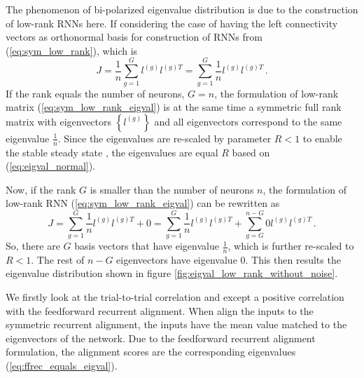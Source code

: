 \documentclass[11pt]{article}
\begin{document}
	The phenomenon of bi-polarized eigenvalue distribution is due to the construction of low-rank RNNs here. If considering the case of having the left connectivity vectors as orthonormal basis for construction of RNNs from (\ref{eq:sym_low_rank}), which is
		\begin{equation} \label{eq:sym_low_rank_eigval}
			J = \frac{1}{n}\sum_{g =1}^{G} l^{(g)} l^{(g)T} = \sum_{g =1}^{G} \frac{1}{n} l^{(g)} l^{(g)T}\, . 
		\end{equation}
	If the rank equals the number of neurons, $G = n$, the formulation of low-rank matrix (\ref{eq:sym_low_rank_eigval}) is at the same time a symmetric full rank matrix with eigenvectors $\left\{l^{(g)}\right\}$ and all eigenvectors correspond to the same eigenvalue $\frac{1}{n}$. Since the eigenvalues are re-scaled by parameter $R < 1$ to enable the stable steady state , the eigenvalues are equal $R$ based on (\ref{eq:eigval_normal}). 
	
	Now, if the rank $G$ is smaller than the number of neurons $n$, the formulation of low-rank RNN (\ref{eq:sym_low_rank_eigval}) can be rewritten as 
		\begin{equation} \label{eq:sym_low_rank_without_noise_eigval}
			J = \sum_{g =1}^{G} \frac{1}{n} l^{(g)} l^{(g)T} + 0 = \sum_{g =1}^{G} \frac{1}{n} l^{(g)} l^{(g)T} + \sum_{g =G}^{n-G} 0 l^{(g)} l^{(g)T} \, .
		\end{equation}
	So, there are $G$ basis vectors that have eigenvalue $\frac{1}{n}$, which is further re-scaled to $R < 1$. The rest of $n-G$ eigenvectors have eigenvalue $0$. This then results the eigenvalue distribution shown in figure \ref{fig:eigval_low_rank_without_noise}. 
	
	We firstly look at the trial-to-trial correlation and except a positive correlation with the feedforward recurrent alignment. When align the inputs to the symmetric recurrent alignment, the inputs have the mean value matched to the eigenvectors of the network. Due to the feedforward recurrent alignment formulation, the alignment scores are the corresponding eigenvalues (\ref{eq:ffrec_equals_eigval}). 
	
\end{document}
